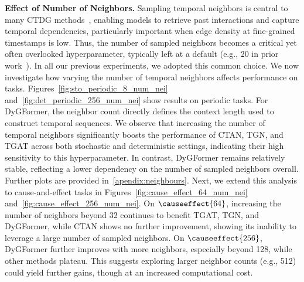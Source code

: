  \textbf{Effect of Number of Neighbors.}
Sampling temporal neighbors is central to many CTDG methods~\cite{dygformer,tgn,tgat,luo2022neighborhood}, enabling models to retrieve past interactions and capture temporal dependencies, particularly important when edge density at fine-grained timestamps is low. Thus, the number of sampled neighbors becomes a critical yet often overlooked hyperparameter, typically left at a default (e.g., 20 in prior work~\cite{dygformer}). In all our previous experiments, we adopted this common choice. We now investigate how varying the number of temporal neighbors affects performance on \benchmarkname tasks.
Figures~\ref{fig:sto_periodic_8_num_nei} and~\ref{fig:det_periodic_256_num_nei} show results on periodic tasks. For DyGFormer, the neighbor count directly defines the context length used to construct temporal sequences. We observe that increasing the number of temporal neighbors significantly boosts the performance of CTAN, TGN, and TGAT across both stochastic and deterministic settings, indicating their high sensitivity to this hyperparameter. In contrast, DyGFormer remains relatively stable, reflecting a lower dependency on the number of sampled neighbors overall. Further plots are provided in~\ref{apendix:neighbours}. Next, we extend this analysis to cause-and-effect tasks in Figures~\ref{fig:cause_effect_64_num_nei} and~\ref{fig:cause_effect_256_num_nei}. On $\causeeffect{64}$, increasing the number of neighbors beyond 32 continues to benefit TGAT, TGN, and DyGFormer, while CTAN shows no further improvement, showing its inability to leverage a large number of sampled neighbors. On $\causeeffect{256}$, DyGFormer further improves with more neighbors, especially beyond 128, while other methods plateau. This suggests exploring larger neighbor counts (e.g., 512) could yield further gains, though at an increased computational cost.





